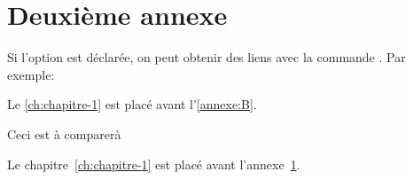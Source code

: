 
\chapter{Deuxi\`eme annexe}
\label{annexe:B}

Si l'option \verb@hypertexte@ est d\'eclar\'ee, on peut obtenir des liens avec
la commande \verb@autoref@. Par exemple:
\begin{center}
Le \autoref{ch:chapitre-1} est plac\'e avant l'\autoref{annexe:B}.
\end{center}
Ceci est \`a comparer\`a
\begin{center}
Le chapitre~\ref{ch:chapitre-1} est plac\'e avant l'annexe~\ref{annexe:B}.
\end{center}